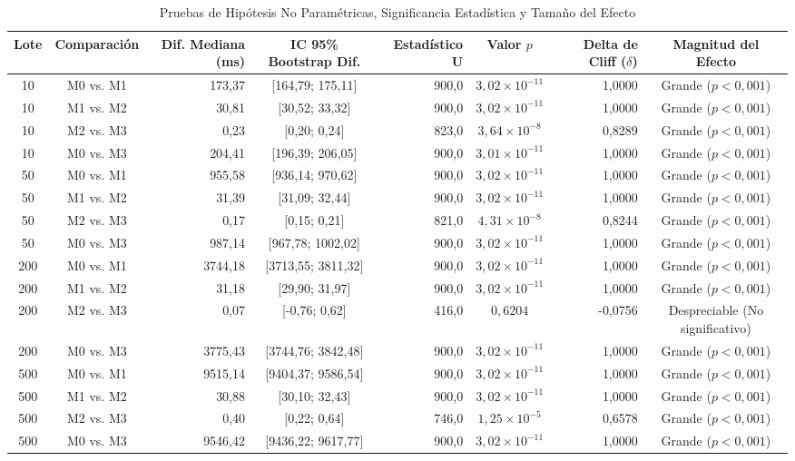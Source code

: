 \documentclass[conference]{IEEEtran}
\begin{document}
\begin{table}[!t]
\centering
\caption{Pruebas de Hipótesis No Paramétricas, Significancia Estadística y Tamaño del Efecto}
\label{tab:estadistica}
\scriptsize
\setlength{\tabcolsep}{2.2pt}
\begin{tabular}{|c|c|r|c|r|c|r|c|}
\hline
\textbf{Lote} & \textbf{Comparación} & \textbf{Dif. Mediana (ms)} & \textbf{IC 95\% Bootstrap Dif.} & \textbf{Estadístico U} & \textbf{Valor $p$} & \textbf{Delta de Cliff ($\delta$)} & \textbf{Magnitud del Efecto} \\
\hline
10 & M0 vs. M1 & 173,37 & [164,79; 175,11] & 900,0 & $3,02 \times 10^{-11}$ & 1,0000 & Grande ($p < 0,001$) \\
10 & M1 vs. M2 & 30,81 & [30,52; 33,32] & 900,0 & $3,02 \times 10^{-11}$ & 1,0000 & Grande ($p < 0,001$) \\
10 & M2 vs. M3 & 0,23 & [0,20; 0,24] & 823,0 & $3,64 \times 10^{-8}$ & 0,8289 & Grande ($p < 0,001$) \\
10 & M0 vs. M3 & 204,41 & [196,39; 206,05] & 900,0 & $3,01 \times 10^{-11}$ & 1,0000 & Grande ($p < 0,001$) \\
\hline
50 & M0 vs. M1 & 955,58 & [936,14; 970,62] & 900,0 & $3,02 \times 10^{-11}$ & 1,0000 & Grande ($p < 0,001$) \\
50 & M1 vs. M2 & 31,39 & [31,09; 32,44] & 900,0 & $3,02 \times 10^{-11}$ & 1,0000 & Grande ($p < 0,001$) \\
50 & M2 vs. M3 & 0,17 & [0,15; 0,21] & 821,0 & $4,31 \times 10^{-8}$ & 0,8244 & Grande ($p < 0,001$) \\
50 & M0 vs. M3 & 987,14 & [967,78; 1002,02] & 900,0 & $3,02 \times 10^{-11}$ & 1,0000 & Grande ($p < 0,001$) \\
\hline
200 & M0 vs. M1 & 3744,18 & [3713,55; 3811,32] & 900,0 & $3,02 \times 10^{-11}$ & 1,0000 & Grande ($p < 0,001$) \\
200 & M1 vs. M2 & 31,18 & [29,90; 31,97] & 900,0 & $3,02 \times 10^{-11}$ & 1,0000 & Grande ($p < 0,001$) \\
200 & M2 vs. M3 & 0,07 & [-0,76; 0,62] & 416,0 & $0,6204$ & -0,0756 & Despreciable (No significativo) \\
200 & M0 vs. M3 & 3775,43 & [3744,76; 3842,48] & 900,0 & $3,02 \times 10^{-11}$ & 1,0000 & Grande ($p < 0,001$) \\
\hline
500 & M0 vs. M1 & 9515,14 & [9404,37; 9586,54] & 900,0 & $3,02 \times 10^{-11}$ & 1,0000 & Grande ($p < 0,001$) \\
500 & M1 vs. M2 & 30,88 & [30,10; 32,43] & 900,0 & $3,02 \times 10^{-11}$ & 1,0000 & Grande ($p < 0,001$) \\
500 & M2 vs. M3 & 0,40 & [0,22; 0,64] & 746,0 & $1,25 \times 10^{-5}$ & 0,6578 & Grande ($p < 0,001$) \\
500 & M0 vs. M3 & 9546,42 & [9436,22; 9617,77] & 900,0 & $3,02 \times 10^{-11}$ & 1,0000 & Grande ($p < 0,001$) \\
\hline
\end{tabular}
\end{table}
\end{document}

